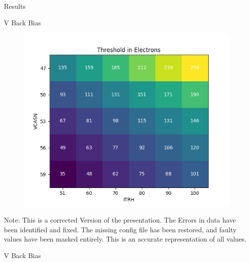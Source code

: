 \begin{frame}{Results}
    \begin{minipage}{.49\textwidth}
	 V Back Bias
    \begin{figure}[H]
	\centering
	\includegraphics[width=\textwidth]{bb0_Heatmap_corrected.png}
    \end{figure}
    \raggedright
    \tiny
    Note: This is a corrected Version of the presentation. The Errors in
    data have been identified and fixed. The
    missing config file has been restored, and faulty values have been
    masked entirely. This is an accurate representation of all values.
    \end{minipage}
    \begin{minipage}{.49\textwidth}
	 V Back Bias
    \begin{figure}[H]
	\centering

\end{figure}
\end{minipage}
\end{frame}
